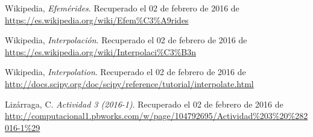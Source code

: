 \documentclass[12pt]{article}
\begin{document}
\begin{thebibliography}{6}

Wikipedia,
\emph{Efemérides}. Recuperado el 02 de febrero de 2016 de \url{https://es.wikipedia.org/wiki/Efem\%C3\%A9rides}

Wikipedia,
\emph{Interpolación}. Recuperado el 02 de febrero de 2016 de \url{https://es.wikipedia.org/wiki/Interpolaci\%C3\%B3n}

Wikipedia,
\emph{Interpolation}. Recuperado el 02 de febrero de 2016 de \url{http://docs.scipy.org/doc/scipy/reference/tutorial/interpolate.html}

Lizárraga, C.
\emph{Actividad 3 (2016-1)}. Recuperado el 02 de febrero de 2016 de \url{http://computacional1.pbworks.com/w/page/104792695/Actividad\%203\%20\%282016-1\%29}

\end{thebibliography}
\end{document}
